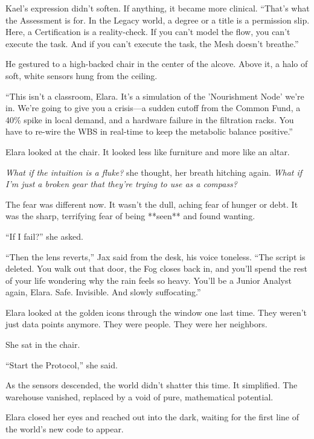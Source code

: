 Kael’s expression didn't soften. If anything, it became more clinical. ``That’s what the Assessment is for. In the Legacy world, a degree or a title is a permission slip. Here, a Certification is a reality-check. If you can't model the flow, you can't execute the task. And if you can't execute the task, the Mesh doesn't breathe.''

He gestured to a high-backed chair in the center of the alcove. Above it, a halo of soft, white sensors hung from the ceiling. 

``This isn't a classroom, Elara. It’s a simulation of the 'Nourishment Node' we’re in. We’re going to give you a crisis—a sudden cutoff from the Common Fund, a 40\% spike in local demand, and a hardware failure in the filtration racks. You have to re-wire the WBS in real-time to keep the metabolic balance positive.''

Elara looked at the chair. It looked less like furniture and more like an altar. 

\textit{What if the intuition is a fluke?} she thought, her breath hitching again. \textit{What if I’m just a broken gear that they’re trying to use as a compass?}

The fear was different now. It wasn't the dull, aching fear of hunger or debt. It was the sharp, terrifying fear of being **seen** and found wanting. 

``If I fail?'' she asked.

``Then the lens reverts,'' Jax said from the desk, his voice toneless. ``The script is deleted. You walk out that door, the Fog closes back in, and you’ll spend the rest of your life wondering why the rain feels so heavy. You'll be a Junior Analyst again, Elara. Safe. Invisible. And slowly suffocating.''

Elara looked at the golden icons through the window one last time. They weren't just data points anymore. They were people. They were her neighbors. 

She sat in the chair.

``Start the Protocol,'' she said. 

As the sensors descended, the world didn't shatter this time. It simplified. The warehouse vanished, replaced by a void of pure, mathematical potential. 


Elara closed her eyes and reached out into the dark, waiting for the first line of the world's new code to appear.
